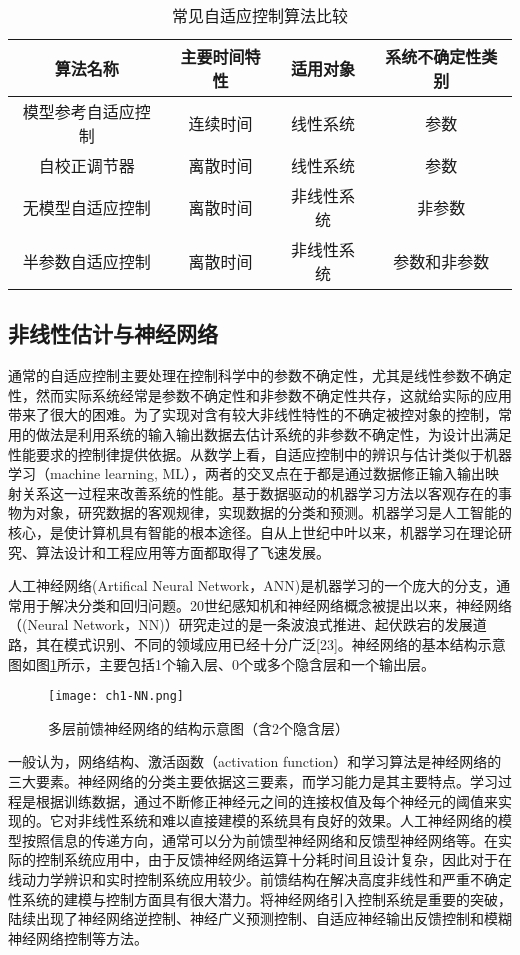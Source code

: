 \begin{table}
\centering
\caption{常见自适应控制算法比较}\label{tab:adaptive}
\begin{tabular*}{0.9\textwidth}{@{\extracolsep{\fill}}cccc}
\toprule
算法名称		&主要时间特性	&适用对象	&系统不确定性类别 \\
\midrule
模型参考自适应控制		&连续时间	&线性系统&参数\\
自校正调节器		&离散时间	& 线性系统&参数\\
无模型自适应控制		&离散时间	&非线性系统&非参数\\
半参数自适应控制		&离散时间&非线性系统	&参数和非参数\\
\bottomrule
\end{tabular*}
\end{table}

\subsection{非线性估计与神经网络}%

通常的自适应控制主要处理在控制科学中的参数不确定性，尤其是线性参数不确定性，然而实际系统经常是参数不确定性和非参数不确定性共存，这就给实际的应用带来了很大的困难。为了实现对含有较大非线性特性的不确定被控对象的控制，常用的做法是利用系统的输入输出数据去估计系统的非参数不确定性，为设计出满足性能要求的控制律提供依据。从数学上看，自适应控制中的辨识与估计类似于机器学习（machine learning, ML），两者的交叉点在于都是通过数据修正输入输出映射关系这一过程来改善系统的性能。基于数据驱动的机器学习方法以客观存在的事物为对象，研究数据的客观规律，实现数据的分类和预测。机器学习是人工智能的核心，是使计算机具有智能的根本途径。自从上世纪中叶以来，机器学习在理论研究、算法设计和工程应用等方面都取得了飞速发展。

人工神经网络(Artifical Neural Network，ANN)是机器学习的一个庞大的分支，通常用于解决分类和回归问题。20世纪感知机和神经网络概念被提出以来，神经网络（(Neural Network，NN)）研究走过的是一条波浪式推进、起伏跌宕的发展道路，其在模式识别、不同的领域应用已经十分广泛[23]。神经网络的基本结构示意图如图\ref{fig:MNN}所示，主要包括1个输入层、0个或多个隐含层和一个输出层。

\begin{figure}
 \centering
 \texttt{[image: ch1-NN.png]}
 \caption{多层前馈神经网络的结构示意图（含2个隐含层）}\label{fig:MNN}
\end{figure}

一般认为，网络结构、激活函数（activation function）和学习算法是神经网络的三大要素。神经网络的分类主要依据这三要素，而学习能力是其主要特点。学习过程是根据训练数据，通过不断修正神经元之间的连接权值及每个神经元的阈值来实现的。它对非线性系统和难以直接建模的系统具有良好的效果。人工神经网络的模型按照信息的传递方向，通常可以分为前馈型神经网络和反馈型神经网络等。在实际的控制系统应用中，由于反馈神经网络运算十分耗时间且设计复杂，因此对于在线动力学辨识和实时控制系统应用较少。前馈结构在解决高度非线性和严重不确定性系统的建模与控制方面具有很大潜力。将神经网络引入控制系统是重要的突破，陆续出现了神经网络逆控制、神经广义预测控制、自适应神经输出反馈控制和模糊神经网络控制等方法。

